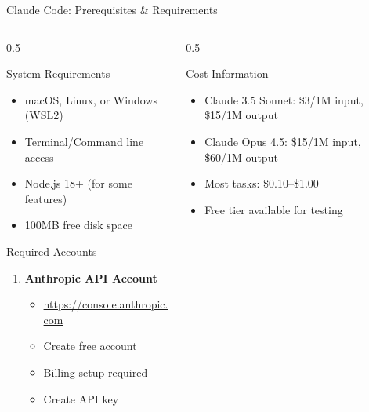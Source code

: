 \documentclass[aspectratio=169,11pt]{beamer}
\begin{document}
\begin{frame}{Claude Code: Prerequisites \& Requirements}
    \begin{columns}[T]
        \begin{column}{0.5\textwidth}
            \begin{block}{System Requirements}
                \begin{itemize}
                    \item macOS, Linux, or Windows (WSL2)
                    \item Terminal/Command line access
                    \item Node.js 18+ (for some features)
                    \item 100MB free disk space
                \end{itemize}
            \end{block}

            \begin{block}{Required Accounts}
                \begin{enumerate}
                    \item \textbf{Anthropic API Account}
                    \begin{itemize}
                        \item \url{https://console.anthropic.com}
                        \item Create free account
                        \item Billing setup required
                        \item Create API key
                    \end{itemize}
                \end{enumerate}
            \end{block}
        \end{column}
        \begin{column}{0.5\textwidth}
            \begin{block}{Cost Information}
                \small
                \begin{itemize}
                    \item Claude 3.5 Sonnet: \$3/1M input, \$15/1M output
                    \item Claude Opus 4.5: \$15/1M input, \$60/1M output
                    \item Most tasks: \$0.10--\$1.00
                    \item Free tier available for testing
                \end{itemize}
            \end{block}


\end{column}
\end{columns}
\end{frame}
\end{document}
